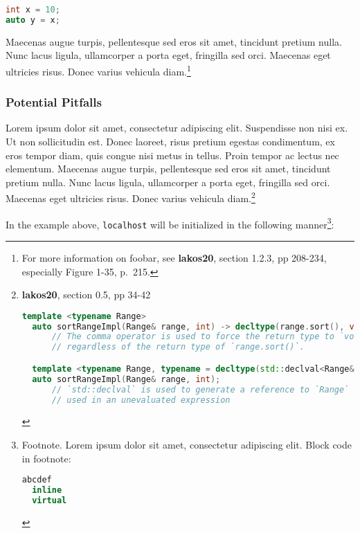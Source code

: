 \documentclass[twoside,10pt,letterpaper,usenames]{newstyle-PearsonGeneric-7-38}
\begin{document}
\begin{lstlisting}[language=C++, caption={missing caption}, label={testlabel}, frame=tb]
int x = 10;
auto y = x;
\end{lstlisting}
    

Maecenas augue turpis, pellentesque sed eros sit amet, tincidunt pretium
nulla. Nunc lacus ligula, ullamcorper a porta eget, fringilla sed orci.
Maecenas eget ultricies risus. Donec varius vehicula
diam.{\cprotect\footnote{For more information on foobar, see
  \textbf{lakos20}, section 1.2.3, pp 208-234, especially Figure 1-35,
  p.~215.}}

\subsubsection[Potential Pitfalls]{Potential Pitfalls}\label{potential-pitfalls}

Lorem ipsum dolor sit amet, consectetur adipiscing elit. Suspendisse non
nisi ex. Ut non sollicitudin est. Donec laoreet, risus pretium egestas
condimentum, ex eros tempor diam, quis congue nisi metus in tellus.
Proin tempor ac lectus nec elementum. Maecenas augue turpis,
pellentesque sed eros sit amet, tincidunt pretium nulla. Nunc lacus
ligula, ullamcorper a porta eget, fringilla sed orci. Maecenas eget
ultricies risus. Donec varius vehicula diam.{\cprotect\footnote{\textbf{lakos20},
  section 0.5, pp 34-42

  \begin{lstlisting}[language=C++, label={testlabel},basicstyle=\ttfamily\footnotesize]
  template <typename Range>
  auto sortRangeImpl(Range& range, int) -> decltype(range.sort(), void());
      // The comma operator is used to force the return type to `void`,
      // regardless of the return type of `range.sort()`.

  template <typename Range, typename = decltype(std::declval<Range&>().sort()>
  auto sortRangeImpl(Range& range, int);
      // `std::declval` is used to generate a reference to `Range` that can be
      // used in an unevaluated expression
  \end{lstlisting}
      }}

In the example above, \texttt{localhost} will be initialized in the
following manner{\cprotect\footnote{Footnote. Lorem ipsum dolor sit
  amet, consectetur adipiscing elit. Block code in footnote:

  \begin{lstlisting}[language=C++, label={testlabel},basicstyle=\ttfamily\footnotesize]
  abcdef
  inline
  virtual
  \end{lstlisting}
      }}:
\end{document}
